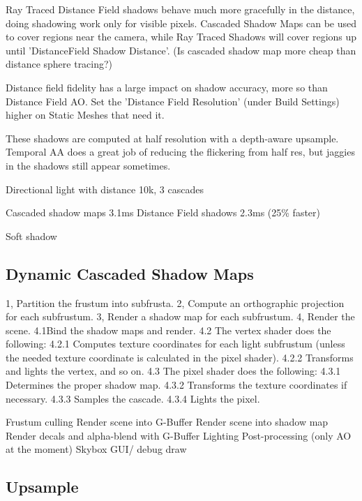 Ray Traced Distance Field shadows behave much more gracefully in the distance, doing shadowing work only for visible pixels. Cascaded Shadow Maps can be used to cover regions near the camera, while Ray Traced Shadows will cover regions up until 'DistanceField Shadow Distance'.
(Is cascaded shadow map more cheap than distance sphere tracing?)


Distance field fidelity has a large impact on shadow accuracy, more so than Distance Field AO. Set the 'Distance Field Resolution' (under Build Settings) higher on Static Meshes that need it.

These shadows are computed at half resolution with a depth-aware upsample. Temporal AA does a great job of reducing the flickering from half res, but jaggies in the shadows still appear sometimes.

Directional light with distance 10k, 3 cascades

Cascaded shadow maps 3.1ms
Distance Field shadows 2.3ms (25\% faster)

Soft shadow


\subsection{Dynamic Cascaded Shadow Maps}
1, Partition the frustum into subfrusta.
2, Compute an orthographic projection for each subfrustum.
3, Render a shadow map for each subfrustum.
4, Render the scene.
 4.1Bind the shadow maps and render.
 4.2 The vertex shader does the following:
  4.2.1 Computes texture coordinates for each light subfrustum (unless the needed texture coordinate is calculated in the pixel shader).
  4.2.2 Transforms and lights the vertex, and so on.
 4.3 The pixel shader does the following:
  4.3.1 Determines the proper shadow map.
  4.3.2 Transforms the texture coordinates if necessary.
  4.3.3 Samples the cascade.
  4.3.4 Lights the pixel.



Frustum culling
Render scene into G-Buffer
Render scene into shadow map
Render decals and alpha-blend with G-Buffer
Lighting
Post-processing (only AO at the moment)
Skybox
GUI/ debug draw

\subsection{Upsample}









